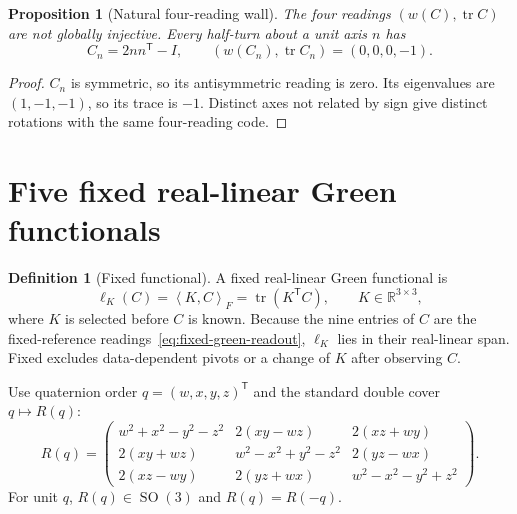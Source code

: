 \documentclass[12pt]{article}
\newtheorem{proposition}[theorem]{Proposition}
\theoremstyle{definition}
\newtheorem{definition}[theorem]{Definition}
\theoremstyle{remark}
\newcommand{\RR}{\mathbb R}
\newcommand{\SO}{\operatorname{SO}}
\newcommand{\tr}{\operatorname{tr}}
\newcommand{\ip}[2]{\left\langle #1,#2\right\rangle}
\begin{document}
\begin{proposition}[Natural four-reading wall]\label{prop:half-turn-wall}
The four readings $(w(C),\tr C)$ are not globally injective.  Every half-turn
about a unit axis $n$ has
\begin{equation}\label{eq:half-turn}
 C_n=2nn^\mathsf T-I,\qquad
 (w(C_n),\tr C_n)=(0,0,0,-1).
\end{equation}
\end{proposition}

\begin{proof}
$C_n$ is symmetric, so its antisymmetric reading is zero.  Its eigenvalues
are $(1,-1,-1)$, so its trace is $-1$.  Distinct axes not related by sign
give distinct rotations with the same four-reading code.
\end{proof}

\section{Five fixed real-linear Green functionals}
\label{sec:fixed_five}

\begin{definition}[Fixed functional]\label{def:fixed-functional}
A fixed real-linear Green functional is
\[
 \ell_K(C)=\ip{K}{C}_F=\tr(K^\mathsf TC),
 \qquad K\in\RR^{3\times3},
\]
where $K$ is selected before $C$ is known.  Because the nine entries of
$C$ are the fixed-reference readings~\eqref{eq:fixed-green-readout},
$\ell_K$ lies in their real-linear span.  Fixed excludes data-dependent
pivots or a change of $K$ after observing $C$.
\end{definition}

Use quaternion order $q=(w,x,y,z)^\mathsf T$ and the standard double cover
$q\mapsto R(q)$:
\begin{equation}\label{eq:quaternion-rotation}
R(q)=
\begin{pmatrix}
w^2+x^2-y^2-z^2&2(xy-wz)&2(xz+wy)\\
2(xy+wz)&w^2-x^2+y^2-z^2&2(yz-wx)\\
2(xz-wy)&2(yz+wx)&w^2-x^2-y^2+z^2
\end{pmatrix}.
\end{equation}
For unit $q$, $R(q)\in\SO(3)$ and $R(q)=R(-q)$.
\end{document}
